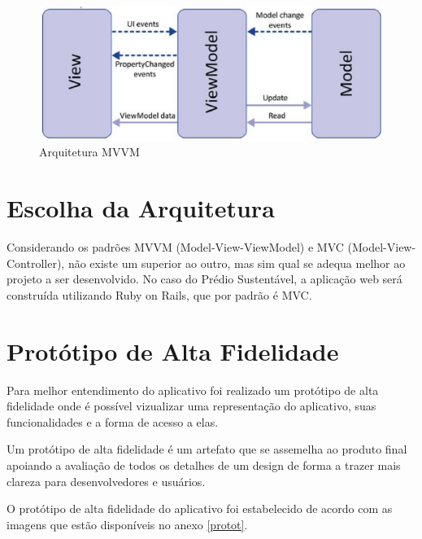 \begin{figure}[!ht]
  \centering
  \includegraphics[keepaspectratio=true,scale=0.6]{figuras/MVVM.eps}
  \caption{Arquitetura MVVM}
  \label{fig:mvvm}
\end{figure}

\section{Escolha da Arquitetura}

Considerando os padrões MVVM (Model-View-ViewModel) e MVC (Model-View-Controller), não existe um superior ao outro, mas sim qual se adequa melhor ao projeto a ser desenvolvido. No caso do Prédio Sustentável, a aplicação web será construída utilizando Ruby on Rails, que por padrão é MVC.

\section{Protótipo de Alta Fidelidade}
\label{sec:prot}
Para melhor entendimento do aplicativo foi realizado um protótipo de alta fidelidade onde é possível vizualizar uma representação do aplicativo, suas funcionalidades e a forma de acesso a elas.

Um protótipo de alta fidelidade é um artefato que se assemelha ao produto final apoiando a avaliação de todos os detalhes de um design de forma a trazer mais clareza para desenvolvedores e usuários.

O protótipo de alta fidelidade do aplicativo foi estabelecido de acordo com as imagens que estão disponíveis no anexo \ref{protot}.

